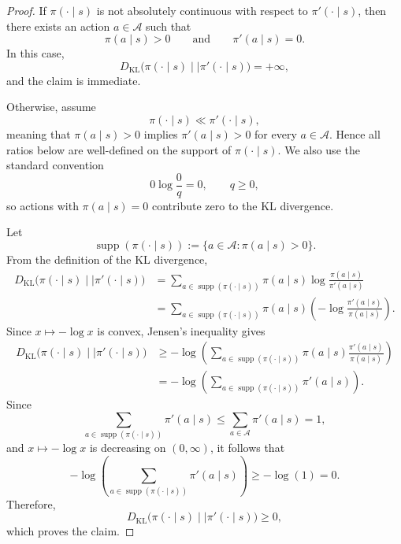 \documentclass[10pt,a4paper]{amsart}
\begin{document}
\begin{proof}
If $\pi(\cdot\mid s)$ is not absolutely continuous with respect to $\pi'(\cdot\mid s)$, then
there exists an action $a\in\mathcal A$ such that
\[
\pi(a\mid s)>0
\qquad\text{and}\qquad
\pi'(a\mid s)=0.
\]
In this case,
\[
D_{\mathrm{KL}}\big(\pi(\cdot\mid s)\mid\mid\pi'(\cdot\mid s)\big)=+\infty,
\]
and the claim is immediate.

Otherwise, assume
\[
\pi(\cdot\mid s)\ll \pi'(\cdot\mid s),
\]
meaning that $\pi(a\mid s)>0$ implies $\pi'(a\mid s)>0$ for every $a\in\mathcal A$. Hence all
ratios below are well-defined on the support of $\pi(\cdot\mid s)$. We also use the standard
convention
\[
0\log\frac{0}{q}=0,
\qquad q\ge0,
\]
so actions with $\pi(a\mid s)=0$ contribute zero to the KL divergence.

Let
\[
\operatorname{supp}(\pi(\cdot\mid s))
:=
\{a\in\mathcal A:\pi(a\mid s)>0\}.
\]
From the definition of the KL divergence,
\begin{align*}
D_{\mathrm{KL}}\big(\pi(\cdot\mid s)\mid\mid\pi'(\cdot\mid s)\big)
&=
\sum_{a\in \operatorname{supp}(\pi(\cdot\mid s))}
\pi(a\mid s)
\log\frac{\pi(a\mid s)}{\pi'(a\mid s)} \\
&=
\sum_{a\in \operatorname{supp}(\pi(\cdot\mid s))}
\pi(a\mid s)
\left(
-\log\frac{\pi'(a\mid s)}{\pi(a\mid s)}
\right).
\end{align*}
Since $x\mapsto-\log x$ is convex, Jensen's inequality gives
\begin{align*}
D_{\mathrm{KL}}\big(\pi(\cdot\mid s)\mid\mid\pi'(\cdot\mid s)\big)
&\ge
-\log\left(
\sum_{a\in \operatorname{supp}(\pi(\cdot\mid s))}
\pi(a\mid s)
\frac{\pi'(a\mid s)}{\pi(a\mid s)}
\right) \\
&=
-\log\left(
\sum_{a\in \operatorname{supp}(\pi(\cdot\mid s))}
\pi'(a\mid s)
\right).
\end{align*}
Since
\[
\sum_{a\in \operatorname{supp}(\pi(\cdot\mid s))}
\pi'(a\mid s)
\le
\sum_{a\in\mathcal A}\pi'(a\mid s)
=
1,
\]
and $x\mapsto-\log x$ is decreasing on $(0,\infty)$, it follows that
\[
-\log\left(
\sum_{a\in \operatorname{supp}(\pi(\cdot\mid s))}
\pi'(a\mid s)
\right)
\ge
-\log(1)
=
0.
\]
Therefore,
\[
D_{\mathrm{KL}}\big(\pi(\cdot\mid s)\mid\mid\pi'(\cdot\mid s)\big)\ge0,
\]
which proves the claim.
\end{proof}
\end{document}
